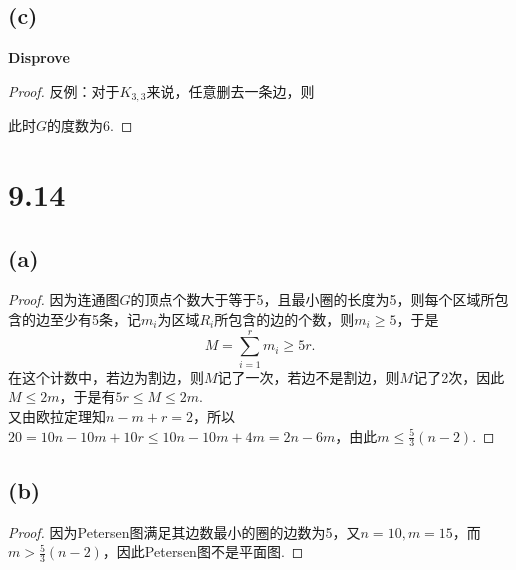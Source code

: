 \documentclass[twocolumn]{article}
\newenvironment{SChinese}{%
	\CJKfamily{gbsn}%
	\CJKtilde
	\CJKnospace}{}
\begin{document}
\begin{CJK}{UTF8}{}
\begin{SChinese}
				\subsection*{(c)}
					\textbf{Disprove}
					\begin{proof}
						反例：对于$K_{3,3}$来说，任意删去一条边，则
						\begin{center}
						\end{center}
						此时$G$的度数为6.
					\end{proof}
			\section*{9.14}
				\subsection*{(a)}	
					\begin{proof}
						因为连通图$G$的顶点个数大于等于5，且最小圈的长度为5，则每个区域所包含的边至少有5条，记$m_i$为区域$R_i$所包含的边的个数，则$m_i\ge5$，于是\begin{displaymath}
						M=\sum_{i=1}^{r}m_i\ge5r.
						\end{displaymath}
						在这个计数中，若边为割边，则$M$记了一次，若边不是割边，则$M$记了2次，因此$M\le2m$，于是有$5r\le M\le 2m$.\\
						又由欧拉定理知$n-m+r=2$，所以$20=10n-10m+10r\le 10n-10m+4m=2n-6m$，由此$m\le\frac{5}{3}(n-2)$.
					\end{proof}
				\subsection*{(b)}
					\begin{proof}
						因为Petersen图满足其边数最小的圈的边数为5，又$n=10,m=15$，而$m>\frac {5}{3}(n-2)$，因此Petersen图不是平面图.
					\end{proof}

\end{SChinese}
\end{CJK}
\end{document}

